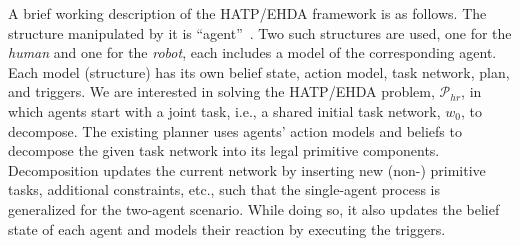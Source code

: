 \documentclass[letterpaper]{article} %
\begin{document}
A brief working description of the HATP/EHDA framework is as follows. 
The structure manipulated by it is ``agent''~\cite{thesisBuisan21,buisan:hal-03684211}.
Two such structures are used, one for the \textit{human} and one for the \textit{robot}, each includes a model of the corresponding agent.
Each model (structure) has its own belief state, action model, task network, plan, and triggers. We are interested in solving the HATP/EHDA problem, $\mathcal{P}_{hr}$, in which agents start with a joint task, i.e., a shared initial task network, $w_0$, to decompose.
The existing planner uses agents' action models and beliefs to decompose the given task network into its legal primitive components. 
Decomposition updates the current network by inserting new (non-) primitive tasks, additional constraints, etc., such that the single-agent process is generalized for the two-agent scenario.
While doing so, it also updates the belief state of each agent and models their reaction by executing the triggers.


\end{document}
